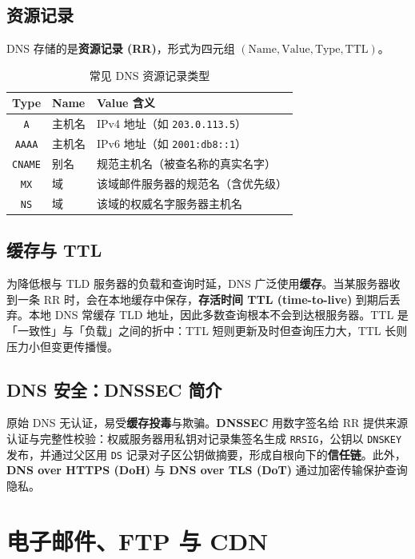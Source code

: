 \subsection{资源记录}

DNS 存储的是\textbf{资源记录 (RR)}，形式为四元组 $(\text{Name}, \text{Value}, \text{Type}, \text{TTL})$。

\begin{table}[H]
\centering
\caption{常见 DNS 资源记录类型}
\begin{tabulary}{\textwidth}{@{}CLL@{}}
\toprule
\textbf{Type} & \textbf{Name} & \textbf{Value 含义} \\
\midrule
\texttt{A} & 主机名 & IPv4 地址（如 \texttt{203.0.113.5}） \\
\texttt{AAAA} & 主机名 & IPv6 地址（如 \texttt{2001:db8::1}） \\
\texttt{CNAME} & 别名 & 规范主机名（被查名称的真实名字） \\
\texttt{MX} & 域 & 该域邮件服务器的规范名（含优先级） \\
\texttt{NS} & 域 & 该域的权威名字服务器主机名 \\
\bottomrule
\end{tabulary}
\end{table}

\subsection{缓存与 TTL}

为降低根与 TLD 服务器的负载和查询时延，DNS 广泛使用\textbf{缓存}。当某服务器收到一条 RR 时，会在本地缓存中保存，\textbf{存活时间 TTL (time-to-live)} 到期后丢弃。本地 DNS 常缓存 TLD 地址，因此多数查询根本不会到达根服务器。TTL 是「一致性」与「负载」之间的折中：TTL 短则更新及时但查询压力大，TTL 长则压力小但变更传播慢。

\subsection{DNS 安全：DNSSEC 简介}

原始 DNS 无认证，易受\textbf{缓存投毒}与欺骗。\textbf{DNSSEC} 用数字签名给 RR 提供来源认证与完整性校验：权威服务器用私钥对记录集签名生成 \texttt{RRSIG}，公钥以 \texttt{DNSKEY} 发布，并通过父区用 \texttt{DS} 记录对子区公钥做摘要，形成自根向下的\textbf{信任链}。此外，\textbf{DNS over HTTPS (DoH)} 与 \textbf{DNS over TLS (DoT)} 通过加密传输保护查询隐私。

\section{电子邮件、FTP 与 CDN}

